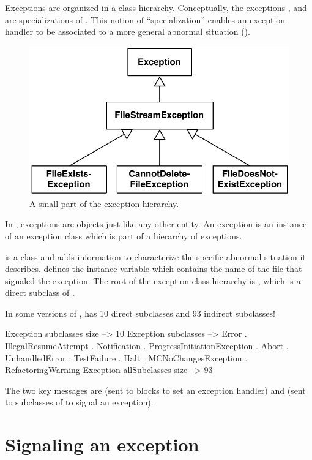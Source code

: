 \documentclass[a4paper,10pt,twoside]{book}
\begin{document}
Exceptions are organized in a class hierarchy. Conceptually, the exceptions ,  and  are specializations of . This notion of ``specialization'' enables an exception handler to be associated to a more general abnormal situation ().

\begin{figure}[ht]\centering
        \includegraphics[width=.5\linewidth]{SimpleHierarchy}
        \caption{A small part of the \pharo exception hierarchy.}
\end{figure}

In \st, exceptions are objects just like any other entity. An exception is an instance of an exception class which is part of a hierarchy of exceptions.

 is a class and adds information to characterize the specific abnormal situation it describes.  defines the  instance variable which contains the name of the file that signaled the exception. The root of the exception class hierarchy is , which is a direct subclass of .

In some versions of \pharo,  has 10 direct subclasses and 93 indirect subclasses!
\begin{code}{} %
Exception subclasses size     --> 10
Exception subclasses 	        --> {Error . IllegalResumeAttempt . Notification . ProgressInitiationException . Abort . UnhandledError . TestFailure . Halt . MCNoChangesException . RefactoringWarning}
Exception allSubclasses size --> 93
\end{code}

The two key messages are  (sent to blocks to set an exception handler) and  (sent to subclasses of  to signal an exception).

\section{Signaling an exception}
\end{document}
